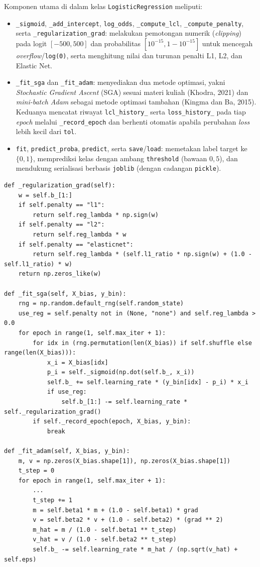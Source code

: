 Komponen utama di dalam kelas \texttt{LogisticRegression} meliputi:
\begin{itemize}
  \item \texttt{\_sigmoid}, \texttt{\_add\_intercept}, \texttt{log\_odds},
        \texttt{\_compute\_lcl}, \texttt{\_compute\_penalty}, serta
        \texttt{\_regularization\_\allowbreak grad}: melakukan pemotongan numerik
        (\textit{clipping}) pada logit $[-500, 500]$ dan probabilitas
        $[10^{-15}, 1 - 10^{-15}]$ untuk mencegah \textit{overflow}/\texttt{log(0)},
        serta menghitung nilai dan turunan penalti L1, L2, dan Elastic Net.
  \item \texttt{\_fit\_sga} dan \texttt{\_fit\_adam}: menyediakan dua metode
        optimasi, yakni \textit{Stochastic Gradient Ascent} (SGA) sesuai materi
        kuliah (Khodra, 2021) dan \textit{mini-batch Adam} sebagai metode
        optimasi tambahan (Kingma dan Ba, 2015). Keduanya mencatat riwayat
        \texttt{lcl\_history\_} serta \texttt{loss\_history\_} pada tiap
        \textit{epoch} melalui \texttt{\_record\_epoch} dan berhenti otomatis
        apabila perubahan \textit{loss} lebih kecil dari \texttt{tol}.
  \item \texttt{fit}, \texttt{predict\_proba}, \texttt{predict}, serta
        \texttt{save}/\texttt{load}: memetakan label target ke $\{0, 1\}$,
        memprediksi kelas dengan ambang \texttt{threshold} (bawaan $0{,}5$), dan
        mendukung serialisasi berbasis \texttt{joblib} (dengan cadangan
        \texttt{pickle}).
\end{itemize}

\begin{lstlisting}
def _regularization_grad(self):
    w = self.b_[1:]
    if self.penalty == "l1":
        return self.reg_lambda * np.sign(w)
    if self.penalty == "l2":
        return self.reg_lambda * w
    if self.penalty == "elasticnet":
        return self.reg_lambda * (self.l1_ratio * np.sign(w) + (1.0 - self.l1_ratio) * w)
    return np.zeros_like(w)

def _fit_sga(self, X_bias, y_bin):
    rng = np.random.default_rng(self.random_state)
    use_reg = self.penalty not in (None, "none") and self.reg_lambda > 0.0
    for epoch in range(1, self.max_iter + 1):
        for idx in (rng.permutation(len(X_bias)) if self.shuffle else range(len(X_bias))):
            x_i = X_bias[idx]
            p_i = self._sigmoid(np.dot(self.b_, x_i))
            self.b_ += self.learning_rate * (y_bin[idx] - p_i) * x_i
            if use_reg:
                self.b_[1:] -= self.learning_rate * self._regularization_grad()
        if self._record_epoch(epoch, X_bias, y_bin):
            break

def _fit_adam(self, X_bias, y_bin):
    m, v = np.zeros(X_bias.shape[1]), np.zeros(X_bias.shape[1])
    t_step = 0
    for epoch in range(1, self.max_iter + 1):
        ...
        t_step += 1
        m = self.beta1 * m + (1.0 - self.beta1) * grad
        v = self.beta2 * v + (1.0 - self.beta2) * (grad ** 2)
        m_hat = m / (1.0 - self.beta1 ** t_step)
        v_hat = v / (1.0 - self.beta2 ** t_step)
        self.b_ -= self.learning_rate * m_hat / (np.sqrt(v_hat) + self.eps)
\end{lstlisting}

